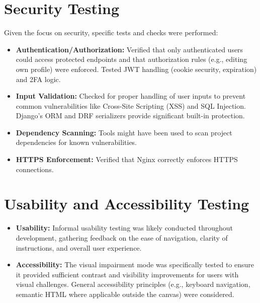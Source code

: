 \section{Security Testing}
\label{sec:security_testing}
Given the focus on security, specific tests and checks were performed:
\begin{itemize}
    \item \textbf{Authentication/Authorization:} Verified that only authenticated users could access protected endpoints and that authorization rules (e.g., editing own profile) were enforced. Tested JWT handling (cookie security, expiration) and 2FA logic.
    \item \textbf{Input Validation:} Checked for proper handling of user inputs to prevent common vulnerabilities like Cross-Site Scripting (XSS) and SQL Injection. Django's ORM and DRF serializers provide significant built-in protection.
    \item \textbf{Dependency Scanning:} Tools might have been used to scan project dependencies for known vulnerabilities.
    \item \textbf{HTTPS Enforcement:} Verified that Nginx correctly enforces HTTPS connections.
\end{itemize}

\section{Usability and Accessibility Testing}
\label{sec:usability_testing}
\begin{itemize}
    \item \textbf{Usability:} Informal usability testing was likely conducted throughout development, gathering feedback on the ease of navigation, clarity of instructions, and overall user experience.
    \item \textbf{Accessibility:} The visual impairment mode was specifically tested to ensure it provided sufficient contrast and visibility improvements for users with visual challenges. General accessibility principles (e.g., keyboard navigation, semantic HTML where applicable outside the canvas) were considered.
\end{itemize}

